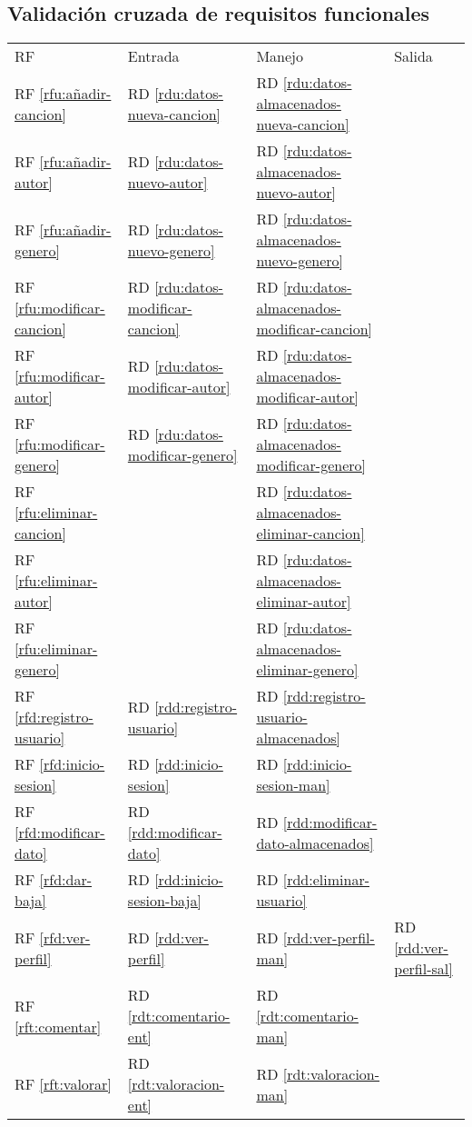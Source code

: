 \documentclass[
  12pt,
  a4paper,
  DIV=12,
  spanish,
]{scrartcl}
\newcounter{RF}
\newcounter{RD}
\begin{document}
\subsection{Validación cruzada de requisitos funcionales}
\begin{tabularx}{\linewidth}{l|XXX}
  RF & Entrada & Manejo & Salida \\
  RF \ref{rfu:añadir-cancion} & RD \ref{rdu:datos-nueva-cancion} & RD \ref{rdu:datos-almacenados-nueva-cancion} & \\
  RF \ref{rfu:añadir-autor} & RD \ref{rdu:datos-nuevo-autor} & RD \ref{rdu:datos-almacenados-nuevo-autor} & \\
  RF \ref{rfu:añadir-genero} & RD \ref{rdu:datos-nuevo-genero} & RD \ref{rdu:datos-almacenados-nuevo-genero}  & \\
  RF \ref{rfu:modificar-cancion} & RD \ref{rdu:datos-modificar-cancion} & RD \ref{rdu:datos-almacenados-modificar-cancion}  & \\
  RF \ref{rfu:modificar-autor} & RD \ref{rdu:datos-modificar-autor} & RD \ref{rdu:datos-almacenados-modificar-autor} & \\
  RF \ref{rfu:modificar-genero} & RD \ref{rdu:datos-modificar-genero} & RD \ref{rdu:datos-almacenados-modificar-genero}  & \\
  RF \ref{rfu:eliminar-cancion} & & RD \ref{rdu:datos-almacenados-eliminar-cancion}  & \\
  RF \ref{rfu:eliminar-autor} & & RD \ref{rdu:datos-almacenados-eliminar-autor} & \\
  RF \ref{rfu:eliminar-genero} &  & RD \ref{rdu:datos-almacenados-eliminar-genero}  & \\
  RF \ref{rfd:registro-usuario} & RD \ref{rdd:registro-usuario} & RD \ref{rdd:registro-usuario-almacenados} & \\
  RF \ref{rfd:inicio-sesion} & RD \ref{rdd:inicio-sesion} & RD \ref{rdd:inicio-sesion-man} & \\
  RF \ref{rfd:modificar-dato} &  RD \ref{rdd:modificar-dato} & RD \ref{rdd:modificar-dato-almacenados} & \\
  RF \ref{rfd:dar-baja} & RD \ref{rdd:inicio-sesion-baja} & RD \ref{rdd:eliminar-usuario} & \\
  RF \ref{rfd:ver-perfil} & RD \ref{rdd:ver-perfil} & RD \ref{rdd:ver-perfil-man} & RD \ref{rdd:ver-perfil-sal} \\
  RF \ref{rft:comentar} & RD \ref{rdt:comentario-ent} & RD \ref{rdt:comentario-man} & \\
  RF \ref{rft:valorar} & RD \ref{rdt:valoracion-ent} & RD \ref{rdt:valoracion-man} & \\

\end{tabularx}
\end{document}
